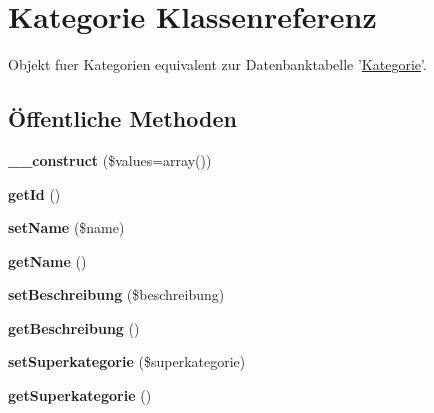 \hypertarget{classKategorie}{\section{\-Kategorie \-Klassenreferenz}
\label{classKategorie}
}


\-Objekt fuer \-Kategorien equivalent zur \-Datenbanktabelle '\hyperlink{classKategorie}{\-Kategorie}'.  


\subsection*{Öffentliche \-Methoden}
\begin{DoxyCompactItemize}
\item 
\hypertarget{classKategorie_aca726077a9ce265eac4cefb820468a2a}{{\bfseries \-\_\-\-\_\-construct} (\$values=array())}\label{classKategorie_aca726077a9ce265eac4cefb820468a2a}

\item 
\hypertarget{classKategorie_a8b95ff95164f354ea65d826d0bbe40ae}{{\bfseries get\-Id} ()}\label{classKategorie_a8b95ff95164f354ea65d826d0bbe40ae}

\item 
\hypertarget{classKategorie_a429e0000c8d7d036cf0e27f7aee8eca8}{{\bfseries set\-Name} (\$name)}\label{classKategorie_a429e0000c8d7d036cf0e27f7aee8eca8}

\item 
\hypertarget{classKategorie_a0afba65fcdb25ba54f0ad8bafb1a8237}{{\bfseries get\-Name} ()}\label{classKategorie_a0afba65fcdb25ba54f0ad8bafb1a8237}

\item 
\hypertarget{classKategorie_a3d407bd50bf7fb7ddebb1c606244202a}{{\bfseries set\-Beschreibung} (\$beschreibung)}\label{classKategorie_a3d407bd50bf7fb7ddebb1c606244202a}

\item 
\hypertarget{classKategorie_ad0ccb786324d93b54a8f2085d531f9f3}{{\bfseries get\-Beschreibung} ()}\label{classKategorie_ad0ccb786324d93b54a8f2085d531f9f3}

\item 
\hypertarget{classKategorie_a6986d2b95ebc2b9d7b48865deebb63a8}{{\bfseries set\-Superkategorie} (\$superkategorie)}\label{classKategorie_a6986d2b95ebc2b9d7b48865deebb63a8}

\item 
\hypertarget{classKategorie_afb2ded80cceb47c4d9f2ed02d258f940}{{\bfseries get\-Superkategorie} ()}\label{classKategorie_afb2ded80cceb47c4d9f2ed02d258f940}

\end{DoxyCompactItemize}


